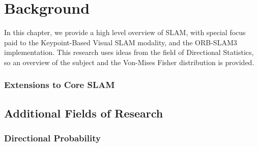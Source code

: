 \section{Background}
\label{background}

In this chapter, we provide a high level overview of SLAM, with special focus paid to the Keypoint-Based Visual SLAM modality, and the ORB-SLAM3 implementation. This research uses ideas from the field of Directional Statistics, so an overview of the subject and the Von-Mises Fisher distribution is provided.



\subsubsection{Extensions to Core SLAM}

\subsection{Additional Fields of Research}

\subsubsection{Directional Probability}